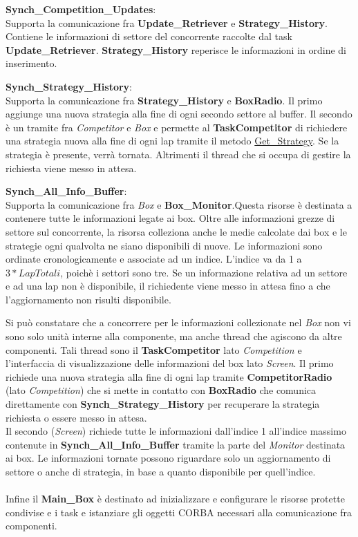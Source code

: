 \begin{description}
\item{\textbf{Synch\_Competition\_Updates}}:\\
Supporta la comunicazione fra \textbf{Update\_Retriever} e \textbf{Strategy\_History}. Contiene le informazioni di settore del 
concorrente raccolte dal task \textbf{Update\_Retriever}. \textbf{Strategy\_History} reperisce le informazioni in ordine
di inserimento.
\item{\textbf{Synch\_Strategy\_History}}:\\
Supporta la comunicazione fra \textbf{Strategy\_History} e \textbf{BoxRadio}. Il primo aggiunge una nuova strategia alla fine di ogni secondo settore
al buffer. Il secondo \`{e} un tramite fra \emph{Competitor} e \emph{Box} e permette al \textbf{TaskCompetitor} di richiedere una strategia
nuova alla fine di ogni lap tramite il metodo \underline{Get\_Strategy}. Se la strategia \`{e} presente, verr\`{a} tornata. 
Altrimenti il thread che si occupa di gestire la richiesta
viene messo in attesa.
\item{\textbf{Synch\_All\_Info\_Buffer}}:\\
Supporta la comunicazione fra \emph{Box} e \textbf{Box\_Monitor}.Questa risorse \`{e} destinata a contenere tutte le informazioni legate ai box.
Oltre alle informazioni grezze di settore sul concorrente, la risorsa colleziona anche le medie calcolate
dai box e le strategie ogni qualvolta ne siano disponibili di nuove. Le informazioni sono ordinate cronologicamente e associate
ad un indice. L'indice va da 1 a $3 * Lap Totali$, poich\`{e} i settori sono tre. Se un informazione relativa ad un settore e ad una lap non
\`{e} disponibile, il richiedente viene messo in attesa fino a che l'aggiornamento non risulti disponibile.
\end{description}
Si pu\`{o} constatare che a concorrere per le informazioni collezionate nel \emph{Box} non vi sono solo unit\`{a} interne alla componente, ma anche
thread che agiscono da altre componenti. Tali thread sono il \textbf{TaskCompetitor} lato \emph{Competition} e l'interfaccia di visualizzazione
delle informazioni del box lato \emph{Screen}. Il primo richiede una nuova strategia alla fine di ogni lap tramite \textbf{CompetitorRadio} (lato
\emph{Competition}) che si mette in contatto con \textbf{BoxRadio} che comunica direttamente con \textbf{Synch\_Strategy\_History} per recuperare
la strategia richiesta o essere messo in attesa.\\
Il secondo (\emph{Screen}) richiede tutte le informazioni dall'indice 1 all'indice massimo contenute in \textbf{Synch\_All\_Info\_Buffer} tramite
la parte del \emph{Monitor} destinata ai box. Le informazioni tornate possono riguardare solo un aggiornamento di settore o anche di strategia,
in base a quanto disponibile per quell'indice.\\
\\
Infine il \textbf{Main\_Box} \`{e} destinato ad inizializzare e configurare le risorse protette condivise e i task e istanziare gli oggetti CORBA necessari 
alla comunicazione fra componenti.
\newpage
